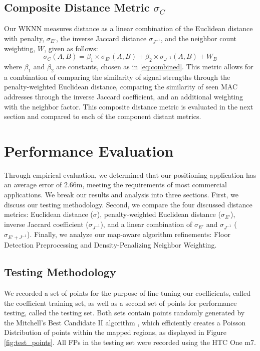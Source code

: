 \documentclass[conference]{IEEEtran}
\begin{document}
\subsection{Composite Distance Metric $\sigma_C$}
\indent Our WKNN measures distance as a linear combination of the Euclidean distance with penalty, $\sigma_{E'}$,  the inverse Jaccard distance $\sigma_{J^{-1}}$, and the neighbor count weighting, $W$,  given as follows:
\begin{equation}
\label{eq:composite}
\sigma_C(A, B)=\beta_1\times\sigma_{E'}(A, B)+\beta_2\times\sigma_{J^{-1}}(A, B)+W_B
\end{equation}
where $\beta_1$ and $\beta_2$ are constants, chosen as in \ref{eq:combined}. This metric allows for a combination of comparing the similarity of signal strengths through the penalty-weighted Euclidean distance, comparing the similarity of seen MAC addresses through the inverse Jaccard coefficient, and an additional weighting with the neighbor factor. This composite distance metric is evaluated in the next section and compared to each of the component distant metrics.

\section{Performance Evaluation}

Through empirical evaluation, we determined that our positioning application has an average error of 2.66m, meeting the requirements of most commercial applications. We break our results and analysis into three sections. First, we discuss our testing methodology. Second, we compare the four discussed distance metrics: Euclidean distance ($\sigma$), penalty-weighted Euclidean distance ($\sigma_{E'}$), inverse Jaccard coefficient ($\sigma_{J^{-1}}$), and a linear combination of $\sigma_{E'}$ and $\sigma_{J^{-1}}$ ($\sigma_{E' + J^{-1}}$). Finally, we analyze our map-aware algorithm refinements: Floor Detection Preprocessing and Density-Penalizing Neighbor Weighting.

\subsection{Testing Methodology}
We recorded a set of points for the purpose of fine-tuning our coefficients, called the coefficient training set, as well as a second set of points for performance testing, called the testing set. Both sets contain points randomly generated by the Mitchell's Best Candidate II algorithm \cite{Machaj}, which efficiently creates a Poisson Distribution of points within the mapped regions, as displayed in Figure \ref{fig:test_points}. All FPs in the testing set were recorded using the HTC One m7. 
\end{document}
